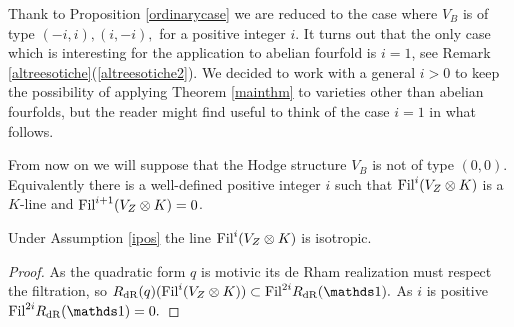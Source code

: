 \documentclass[11pt]{amsart}
\begin{document}
Thank to Proposition \ref{ordinarycase}  we are reduced to the case where $V_B$ is of type $(-i,i),(i,-i),$ for a positive integer $i$.
 It turns out that the only case which is interesting for the application to abelian fourfold is $i=1$, see Remark \ref{altreesotiche}(\ref{altreesotiche2}). We decided to work with a general $i>0$ to keep the possibility of applying  Theorem \ref{mainthm} to varieties other than abelian fourfolds, but the reader might find useful to think of the case $i=1$ in what follows.
 
 \begin{assumption}\label{ipos}
From now on we will suppose that the Hodge structure $V_B$ is not of type $(0,0)$. Equivalently there is a well-defined positive integer $i$ such that $\textnormal{Fil}^i(V_Z\otimes K)$ is a $K$-line and $\textnormal{Fil}^{i+1}(V_Z\otimes K)=0$.
\end{assumption}
 \begin{lemma}\label{isotrop}
 Under Assumption \ref{ipos} the line 
 $\textnormal{Fil}^i(V_Z\otimes K)$ is isotropic.
\end{lemma}
\begin{proof}
As the quadratic form $q$ is motivic its de Rham realization must respect the filtration, so $R_{\dR}(q)(\Fil^i(V_Z\otimes K)) \subset \Fil^{2i}R_{\dR}(\one).$ As $i$ is positive $\Fil^{2i}R_{\dR}(\one) =0.$
\end{proof}
\end{document}
